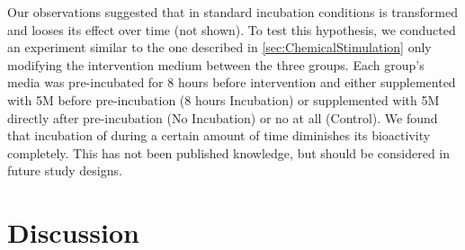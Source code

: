 Our observations suggested that in standard incubation conditions \Yoda{} is transformed and looses its effect over time (not shown). To test this hypothesis, we conducted an experiment similar to the one described in \ref{sec:ChemicalStimulation} only modifying the intervention medium between the three groups. Each group's media was pre-incubated for 8 hours before intervention and either supplemented with 5\textmu{}M \Yoda{} before pre-incubation (8 hours Incubation) or supplemented with 5\textmu{}M \Yoda{} directly after pre-incubation (No Incubation) or no \Yoda{} at all (Control). We found that incubation of \Yoda{} during a certain amount of time diminishes its bioactivity completely. This has not been published knowledge, but should be considered in future study designs.

\chapter{Discussion}


